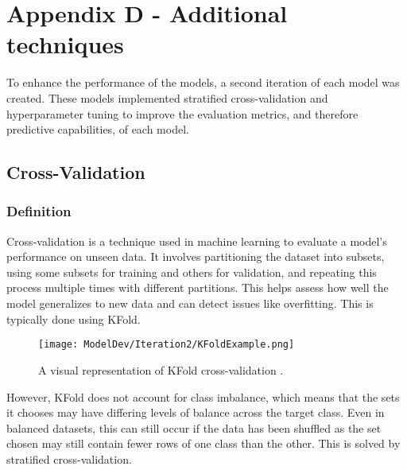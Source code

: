 \begingroup
\renewcommand\thechapter{D}
\titleformat{\chapter}[display]
{\normalfont\huge\bfseries}{}{20pt}{\Huge}
\setcounter{section}{0} %

\chapter*{Appendix D - Additional techniques}

To enhance the performance of the models, a second iteration of each model was created.
These models implemented stratified cross-validation and hyperparameter tuning to improve 
the evaluation metrics, and therefore predictive capabilities, of each model.

\section{Cross-Validation}
\subsection{Definition}
Cross-validation is a technique used in machine learning to evaluate a model's performance on unseen data. It involves 
partitioning the dataset into subsets, using some subsets for training and others for validation, and repeating this
process multiple times with different partitions. This helps assess how well the model generalizes to new data and can
detect issues like overfitting. This is typically done using KFold.

\begin{figure}[H]
    \centering 
    \texttt{[image: ModelDev/Iteration2/KFoldExample.png]}
    \caption{A visual representation of KFold cross-validation \autocite{rosaen_scikit-learn_nodate}.}
    \label{fig:KFExample}
\end{figure}

\para However, KFold does not account for class imbalance, which means that the sets it chooses may have 
differing levels of balance across the target class. Even in balanced datasets, this can still occur if the 
data has been shuffled as the set chosen may still contain fewer rows of one class than the other. This is 
solved by stratified cross-validation.

